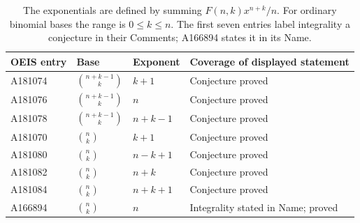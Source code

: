 \documentclass[11pt]{article}
\begin{document}
\begin{table}[ht]
\centering\small
\begin{tabular}{@{}llll@{}}
\toprule
OEIS entry & Base & Exponent & Coverage of displayed statement\\
\midrule
A181074 & $\binom{n+k-1}{k}$ & $k+1$ & Conjecture proved\\
A181076 & $\binom{n+k-1}{k}$ & $n$ & Conjecture proved\\
A181078 & $\binom{n+k-1}{k}$ & $n+k-1$ & Conjecture proved\\
A181070 & $\binom nk$ & $k+1$ & Conjecture proved\\
A181080 & $\binom nk$ & $n-k+1$ & Conjecture proved\\
A181082 & $\binom nk$ & $n+k$ & Conjecture proved\\
A181084 & $\binom nk$ & $n+k+1$ & Conjecture proved\\
A166894 & $\binom nk$ & $n$ & Integrality stated in Name; proved\\
\bottomrule
\end{tabular}
\caption{The exponentials are defined by summing $F(n,k)x^{n+k}/n$.
For ordinary binomial bases the range is $0\le k\le n$.
The first seven entries label integrality a conjecture in their Comments;
A166894 states it in its Name.}\label{tab:coverage}
\end{table}
\end{document}
